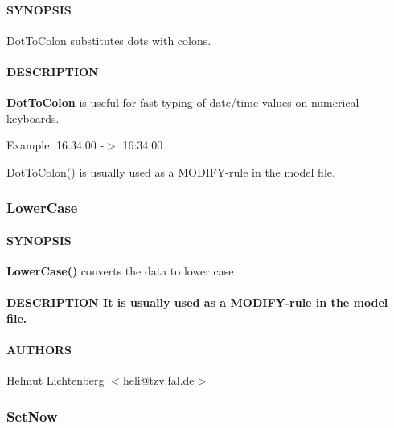 \paragraph*{SYNOPSIS\label{DotToColon_SYNOPSIS}}


DotToColon substitutes dots with colons.

\paragraph*{DESCRIPTION\label{DotToColon_DESCRIPTION}}


\textbf{DotToColon} is useful for fast typing of date/time values on numerical keyboards.



Example:
   16.34.00 -$>$  16:34:00



DotToColon() is usually used as a MODIFY-rule in the model file.

\subsubsection{LowerCase\label{LowerCase}}




\paragraph*{SYNOPSIS\label{LowerCase_SYNOPSIS}}


\textbf{LowerCase()} converts the data to lower case

\paragraph*{DESCRIPTION
It is usually used as a MODIFY-rule in the model file.\label{LowerCase_DESCRIPTION_It_is_usually_used_as_a_MODIFY-rule_in_the_model_file_}}
\paragraph*{AUTHORS\label{LowerCase_AUTHORS}}


Helmut Lichtenberg $<$heli@tzv.fal.de$>$

\subsubsection{SetNow\label{SetNow}}




